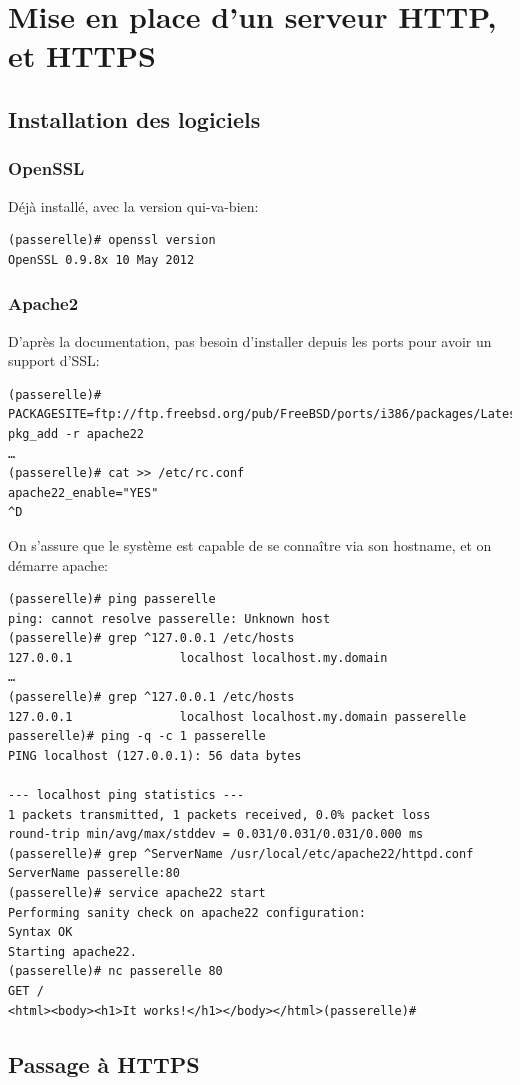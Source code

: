 \documentclass[a4paper]{article}
\begin{document}
\section{Mise en place d'un serveur HTTP, et HTTPS}
\subsection{Installation des logiciels}
\subsubsection{OpenSSL}
Déjà installé, avec la version qui-va-bien:
\begin{verbatim}
(passerelle)# openssl version
OpenSSL 0.9.8x 10 May 2012
\end{verbatim}
\subsubsection{Apache2}
D'après la documentation, pas besoin d'installer depuis les ports
pour avoir un support d'SSL:
\begin{verbatim}
(passerelle)# PACKAGESITE=ftp://ftp.freebsd.org/pub/FreeBSD/ports/i386/packages/Latest/ pkg_add -r apache22
…
(passerelle)# cat >> /etc/rc.conf
apache22_enable="YES"
^D
\end{verbatim}

On s'assure que le système est capable de se connaître via son hostname,
et on démarre apache:
\begin{verbatim}
(passerelle)# ping passerelle
ping: cannot resolve passerelle: Unknown host
(passerelle)# grep ^127.0.0.1 /etc/hosts
127.0.0.1               localhost localhost.my.domain
…
(passerelle)# grep ^127.0.0.1 /etc/hosts
127.0.0.1               localhost localhost.my.domain passerelle
passerelle)# ping -q -c 1 passerelle
PING localhost (127.0.0.1): 56 data bytes

--- localhost ping statistics ---
1 packets transmitted, 1 packets received, 0.0% packet loss
round-trip min/avg/max/stddev = 0.031/0.031/0.031/0.000 ms
(passerelle)# grep ^ServerName /usr/local/etc/apache22/httpd.conf 
ServerName passerelle:80
(passerelle)# service apache22 start
Performing sanity check on apache22 configuration:
Syntax OK
Starting apache22.
(passerelle)# nc passerelle 80
GET /
<html><body><h1>It works!</h1></body></html>(passerelle)# 
\end{verbatim}

\subsection{Passage à HTTPS}
\end{document}
